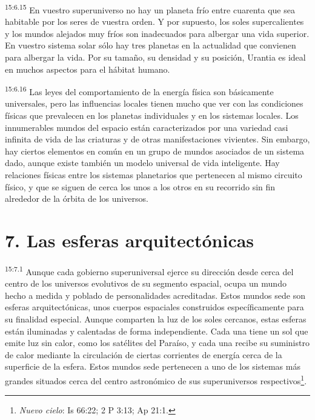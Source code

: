 \par
\textsuperscript{15:6.15} En vuestro superuniverso no hay un planeta frío entre cuarenta que sea habitable por los seres de vuestra orden. Y por supuesto, los soles supercalientes y los mundos alejados muy fríos son inadecuados para albergar una vida superior. En vuestro sistema solar sólo hay tres planetas en la actualidad que convienen para albergar la vida. Por su tamaño, su densidad y su posición, Urantia es ideal en muchos aspectos para el hábitat humano.

\par
\textsuperscript{15:6.16} Las leyes del comportamiento de la energía física son básicamente universales, pero las influencias locales tienen mucho que ver con las condiciones físicas que prevalecen en los planetas individuales y en los sistemas locales. Los innumerables mundos del espacio están caracterizados por una variedad casi infinita de vida de las criaturas y de otras manifestaciones vivientes. Sin embargo, hay ciertos elementos en común en un grupo de mundos asociados de un sistema dado, aunque existe también un modelo universal de vida inteligente. Hay relaciones físicas entre los sistemas planetarios que pertenecen al mismo circuito físico, y que se siguen de cerca los unos a los otros en su recorrido sin fin alrededor de la órbita de los universos.

\section*{7. Las esferas arquitectónicas}
\par
\textsuperscript{15:7.1} Aunque cada gobierno superuniversal ejerce su dirección desde cerca del centro de los universos evolutivos de su segmento espacial, ocupa un mundo hecho a medida y poblado de personalidades acreditadas. Estos mundos sede son esferas arquitectónicas, unos cuerpos espaciales construidos específicamente para su finalidad especial. Aunque comparten la luz de los soles cercanos, estas esferas están iluminadas y calentadas de forma independiente. Cada una tiene un sol que emite luz sin calor, como los satélites del Paraíso, y cada una recibe su suministro de calor mediante la circulación de ciertas corrientes de energía cerca de la superficie de la esfera. Estos mundos sede pertenecen a uno de los sistemas más grandes situados cerca del centro astronómico de sus superuniversos respectivos\footnote{\textit{Nuevo cielo}: Is 66:22; 2 P 3:13; Ap 21:1.}.

